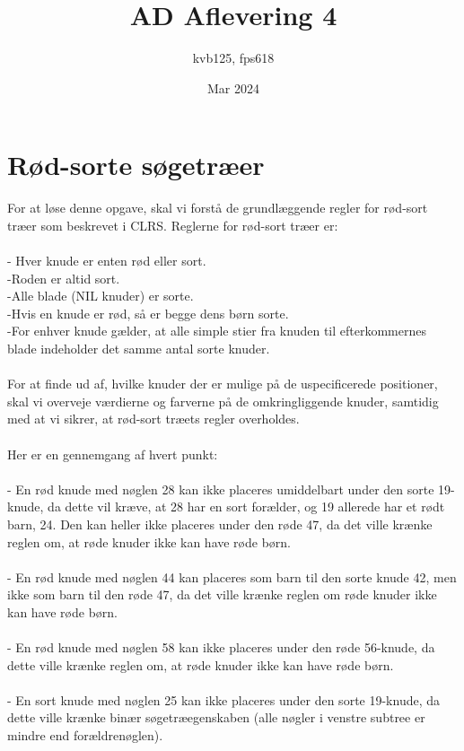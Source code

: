 \documentclass{article}
\title{AD Aflevering 4}
\author{kvb125, fps618}
\date{Mar 2024}
\begin{document}
\maketitle

\section{Rød-sorte søgetræer}
For at løse denne opgave, skal vi forstå de grundlæggende regler for rød-sort træer som beskrevet i CLRS. Reglerne for rød-sort træer er:
\\
\\
- Hver knude er enten rød eller sort.
\\
-Roden er altid sort.
\\
-Alle blade (NIL knuder) er sorte.
\\
-Hvis en knude er rød, så er begge dens børn sorte.
\\
-For enhver knude gælder, at alle simple stier fra knuden til efterkommernes blade indeholder det samme antal sorte knuder.
\\
\\
For at finde ud af, hvilke knuder der er mulige på de uspecificerede positioner, skal vi overveje værdierne og farverne på de omkringliggende knuder, samtidig med at vi sikrer, at rød-sort træets regler overholdes.
\\
\\
Her er en gennemgang af hvert punkt:
\\
\\
- En rød knude med nøglen 28 kan ikke placeres umiddelbart under den sorte 19-knude, da dette vil kræve, at 28 har en sort forælder, og 19 allerede har et rødt barn, 24. Den kan heller ikke placeres under den røde 47, da det ville krænke reglen om, at røde knuder ikke kan have røde børn.
\\
\\
- En rød knude med nøglen 44 kan placeres som barn til den sorte knude 42, men ikke som barn til den røde 47, da det ville krænke reglen om røde knuder ikke kan have røde børn.
\\
\\
- En rød knude med nøglen 58 kan ikke placeres under den røde 56-knude, da dette ville krænke reglen om, at røde knuder ikke kan have røde børn.
\\
\\
- En sort knude med nøglen 25 kan ikke placeres under den sorte 19-knude, da dette ville krænke binær søgetræegenskaben (alle nøgler i venstre subtree er mindre end forældrenøglen).
\end{document}
